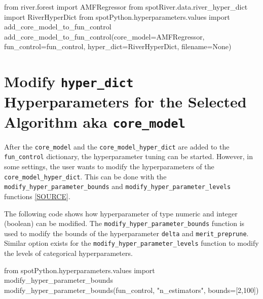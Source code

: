 \documentclass[
  letterpaper,
  DIV=11,
  numbers=noendperiod]{scrreprt}
\newenvironment{Shaded}{\begin{snugshade}}{\end{snugshade}}
\newcommand{\DecValTok}[1]{\textcolor[rgb]{0.68,0.00,0.00}{#1}}
\newcommand{\ImportTok}[1]{\textcolor[rgb]{0.00,0.46,0.62}{#1}}
\newcommand{\NormalTok}[1]{\textcolor[rgb]{0.00,0.23,0.31}{#1}}
\newcommand{\OperatorTok}[1]{\textcolor[rgb]{0.37,0.37,0.37}{#1}}
\newcommand{\StringTok}[1]{\textcolor[rgb]{0.13,0.47,0.30}{#1}}
\newcommand{\VariableTok}[1]{\textcolor[rgb]{0.07,0.07,0.07}{#1}}
\begin{document}
\begin{Shaded}
\begin{Highlighting}[]
\ImportTok{from}\NormalTok{ river.forest }\ImportTok{import}\NormalTok{ AMFRegressor}
\ImportTok{from}\NormalTok{ spotRiver.data.river\_hyper\_dict }\ImportTok{import}\NormalTok{ RiverHyperDict}
\ImportTok{from}\NormalTok{ spotPython.hyperparameters.values }\ImportTok{import}\NormalTok{ add\_core\_model\_to\_fun\_control}
\NormalTok{add\_core\_model\_to\_fun\_control(core\_model}\OperatorTok{=}\NormalTok{AMFRegressor,}
\NormalTok{                              fun\_control}\OperatorTok{=}\NormalTok{fun\_control,}
\NormalTok{                              hyper\_dict}\OperatorTok{=}\NormalTok{RiverHyperDict,}
\NormalTok{                              filename}\OperatorTok{=}\VariableTok{None}\NormalTok{)}
\end{Highlighting}
\end{Shaded}

\hypertarget{modify-hyper_dict-hyperparameters-for-the-selected-algorithm-aka-core_model-1}{%
\section{\texorpdfstring{Modify \texttt{hyper\_dict} Hyperparameters for
the Selected Algorithm aka
\texttt{core\_model}}{Modify hyper\_dict Hyperparameters for the Selected Algorithm aka core\_model}}\label{modify-hyper_dict-hyperparameters-for-the-selected-algorithm-aka-core_model-1}}

After the \texttt{core\_model} and the \texttt{core\_model\_hyper\_dict}
are added to the \texttt{fun\_control} dictionary, the hyperparameter
tuning can be started. However, in some settings, the user wants to
modify the hyperparameters of the \texttt{core\_model\_hyper\_dict}.
This can be done with the \texttt{modify\_hyper\_parameter\_bounds} and
\texttt{modify\_hyper\_parameter\_levels} functions
\href{https://github.com/sequential-parameter-optimization/spotPython/blob/main/src/spotPython/hyperparameters/values.py}{{[}SOURCE{]}}.

The following code shows how hyperparameter of type numeric and integer
(boolean) can be modified. The \texttt{modify\_hyper\_parameter\_bounds}
function is used to modify the bounds of the hyperparameter
\texttt{delta} and \texttt{merit\_preprune}. Similar option exists for
the \texttt{modify\_hyper\_parameter\_levels} function to modify the
levels of categorical hyperparameters.

\begin{Shaded}
\begin{Highlighting}[]
\ImportTok{from}\NormalTok{ spotPython.hyperparameters.values }\ImportTok{import}\NormalTok{ modify\_hyper\_parameter\_bounds}
\NormalTok{modify\_hyper\_parameter\_bounds(fun\_control, }\StringTok{"n\_estimators"}\NormalTok{, bounds}\OperatorTok{=}\NormalTok{[}\DecValTok{2}\NormalTok{,}\DecValTok{100}\NormalTok{])}
\end{Highlighting}
\end{Shaded}
\end{document}
